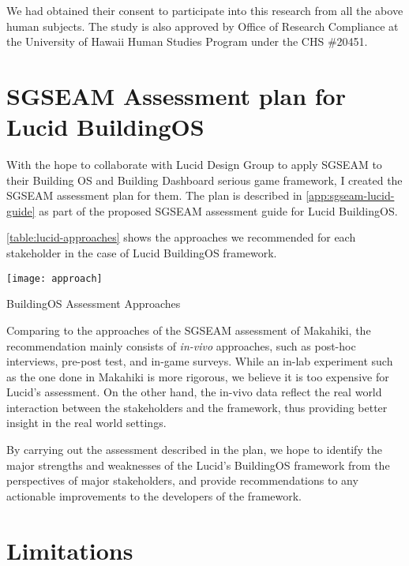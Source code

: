 We had obtained their consent to participate into this research from all the above human subjects. The study is also approved by Office of Research Compliance at the University of Hawaii Human Studies Program under the CHS \#20451.

\section{SGSEAM Assessment plan for Lucid BuildingOS}

With the hope to collaborate with Lucid Design Group to apply SGSEAM to their Building OS and Building Dashboard serious game framework, I created the SGSEAM assessment plan for them. The plan is described in \autoref{app:sgseam-lucid-guide} as part of the proposed SGSEAM assessment guide for Lucid BuildingOS. 

\autoref{table:lucid-approaches} shows the approaches we recommended
for each stakeholder in the case of Lucid BuildingOS framework.
 
\begin{table}[ht!]
  \center
  \texttt{[image: approach]}
  \caption{BuildingOS Assessment Approaches}
  \label{table:lucid-approaches}
\end{table}

Comparing to the approaches of the SGSEAM assessment of Makahiki, the recommendation mainly consists of {\em in-vivo} approaches, such as post-hoc interviews, pre-post test, and in-game surveys. While an in-lab experiment such as the one done in Makahiki is more rigorous, we believe it is too expensive for Lucid's assessment. On the other hand, the in-vivo data reflect the real world interaction between the stakeholders and the framework, thus providing better insight in the real world settings.

By carrying out the assessment described in the plan, we hope to identify the major strengths and weaknesses of the Lucid's BuildingOS framework from the perspectives of major stakeholders, and provide recommendations to any actionable improvements to the developers of the framework.

\section{Limitations}

